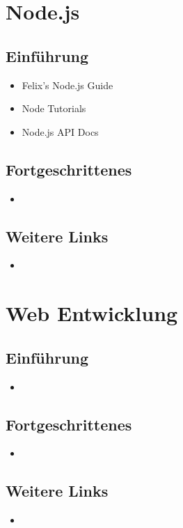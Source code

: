\section{Node.js}
\label{sec:ti-nodejs}

\subsection*{Einführung}
\begin{itemize}
	\item Felix's Node.js Guide \cite{Nodeguide} %
	\item Node Tutorials \cite{NodeTuts}
	\item Node.js API Docs \cite{NodejsAPIDocs}
\end{itemize}

\subsection*{Fortgeschrittenes}
\begin{itemize}
	\item
\end{itemize}

\subsection*{Weitere Links}
\begin{itemize}
	\item
\end{itemize}

\section{Web Entwicklung}
\label{sec:ti-web-entwicklung}

\subsection*{Einführung}
\begin{itemize}
	\item
\end{itemize}

\subsection*{Fortgeschrittenes}
\begin{itemize}
	\item
\end{itemize}

\subsection*{Weitere Links}
\begin{itemize}
	\item
\end{itemize}